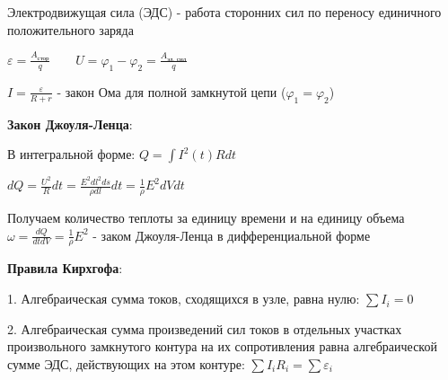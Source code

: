Электродвижущая сила (ЭДС) - работа сторонних сил по переносу единичного положительного заряда

$\varepsilon = \frac{A_\text{стор}}{q} \qquad U = \varphi_1 - \varphi_2 = \frac{A_{\text{эл. сил}}}{q}$

$I = \frac{\varepsilon}{R + r}$ - закон Ома для полной замкнутой цепи ($\varphi_1 = \varphi_2$)

\textbf{Закон Джоуля-Ленца}: 

В интегральной форме: $Q = \int I^2(t) Rdt$

$dQ = \frac{U^2}{R} dt = \frac{E^2 dl^2 ds}{\rho dl} dt = \frac{1}{\rho} E^2 dV dt$

Получаем количество теплоты за единицу времени и на единицу объема $\omega = \frac{dQ}{dt dV} = \frac{1}{\rho} E^2$ - заком Джоуля-Ленца в дифференциальной форме

\textbf{Правила Кирхгофа}:

1. Алгебраическая сумма токов, сходящихся в узле, равна нулю: $\sum I_i = 0$

2. Алгебраическая сумма произведений сил токов в отдельных участках произвольного замкнутого контура на их сопротивления равна алгебраической сумме ЭДС, действующих на этом контуре: $\sum I_i R_i = \sum \varepsilon_i$


